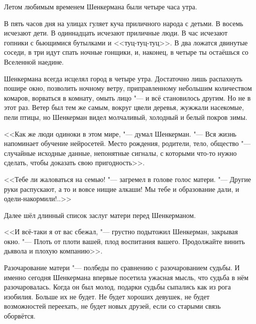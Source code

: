 
\asterism

Летом любимым временем Шенкермана были четыре часа утра.

В пять часов дня на улицах гуляет куча приличного народа с детьми.
В восемь исчезают дети.
В одиннадцать исчезают приличные люди.
В час исчезают гопники с бьющимися бутылками и <<туц-туц-туц>>.
В два ложатся двинутые соседи, в три идут спать ночные гонщики, и, наконец, в четыре ты остаёшься со Вселенной наедине.

Шенкермана всегда исцелял город в четыре утра.
Достаточно лишь распахнуть пошире окно, позволить ночному ветру, приправленному небольшим количеством комаров, ворваться в комнату, омыть лицо "--- и всё становилось другим.
Но не в этот раз.
Ветер был тем же самым, вокруг цвели деревья, жужжали насекомые, пели птицы, но Шенкерман видел молчаливый, холодный и белый покров зимы.

<<Как же люди одиноки в этом мире, "--- думал Шенкерман.
"--- Вся жизнь напоминает обучение нейросетей.
Место рождения, родители, тело, общество "--- случайные исходные данные, непонятные сигналы, с которыми что-то нужно сделать, чтобы доказать свою пригодность>>.

<<Тебе ли жаловаться на семью! "--- загремел в голове голос матери.
"--- Другие руки распускают, а то и вовсе нищие алкаши!
Мы тебе и образование дали, и одели-накормили!..>>

Далее шёл длинный список заслуг матери перед Шенкерманом.

<<И всё-таки я от вас сбежал, "--- грустно подытожил Шенкерман, закрывая окно.
"--- Плоть от плоти вашей, плод воспитания вашего.
Продолжайте винить дьявола и плохую компанию>>.

Разочарование матери "--- полбеды по сравнению с разочарованием судьбы.
И именно сегодня Шенкермана впервые посетила ужасная мысль, что судьба в нём разочаровалась.
Когда он был молод, подарки судьбы сыпались как из рога изобилия.
Больше их не будет.
Не будет хороших девушек, не будет возможностей переехать, не будет новых друзей, если со старыми связь оборвётся.

